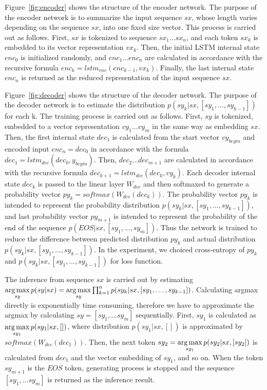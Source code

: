 \documentclass[senior,final,11pt]{iscs-thesis}
\newcommand{\argmax}{\mathop{\rm arg\,max}\limits}
\begin{document}
Figure~\ref{fig:encoder} shows the structure of the encoder network.  The purpose of the encoder network is to summarize the input sequence $sx$, whose length varies depending on the sequence $sx$, into one fixed size vector.
This process is carried out as follows. 
First, $sx$ is tokenized to sequence $sx_{1} \dots sx_{n}$, and each token $sx_{k}$ is embedded to its vector representation $vx_{k}$. 
Then, the initial LSTM internal state $enc_0$ is initialized randomly, 
and $ enc_{1} \dots enc_{n} $ are calculated in accordance with the recursive formula $ enc_{k} = lstm_{enc}(enc_{k-1},vx_{k}) $.
Finally, the last internal state $ enc_{n}$ is returned as the reduced representation of the input sequence $sx$.

Figure~\ref{fig:decoder} shows the structure of the decoder network.  The purpose of the decoder network is to estimate the distribution $ p(sy_k|sx,[sy_1,\dots,sy_{k-1}]) $ for each k. 
The training process is carried out as follows. 
First, $sy$ is tokenized, embedded to a vector representation $vy_{1} \dots vy_{m}$ in the same way as embedding $sx$.
Then, the first internal state $ dec_{1}$ is calculated from the start vector $vy_{begin}$ and encoded input $ enc_{n} = dec_{0} $ in accordance with the formula  $ dec_1 = lstm_{dec}(dec_{0},y_{begin}) $.
Then, $ dec_{2} \dots dec_{m+1} $ are calculated in accordance with the recursive formula $ dec_{k+1} = lstm_{dec}(dec_{k},vy_{k}) $.
Each decoder internal state $ dec_{k} $ is passed to the linear layer $ W_{dec} $ and then softmaxed to generate a probability vector $ py_{k} = softmax(W_{dec}(dec_{k}))$.
The probability vector $ py_{k} $ is intended to represent the probability distribution $ p(sy_k|sx,[sy_1,\dots,sy_{k-1}]) $,
and last probability vector $ py_{m+1} $ is intended to represent the probability of the end of the sequence $ p(EOS|sx,[sy_1,\dots,sy_{m}]) $.
Thus the network is trained to reduce the difference between predicted distribution $ py_{k} $ and actual distribution $ p(sy_k|sx,[sy_1,\dots,sy_{k-1}]) $.
In the experiment, we choiced cross-entropy of $ py_{k} $ and $ p(sy_k|sx,[sy_1,\dots,sy_{k-1}]) $ for loss function.

The inference from sequence $sx$ is carried out by estimating
$ \argmax_{sy} p(sy|sx) = \argmax_{sy} \prod_{k=1}^n p(sy_k|sx,[sy_1,\dots,sy_{k-1}]) $.
Calculating argmax directly is exponentially time consuming, therefore we have to approximate the argmax by calculating $sy = [sy_1, \dots sy_m]$ sequentially.
First, $sy_1$ is calculated as $ \argmax_{sy_1} p(sy_1|sx,[]) $, where distribution $ p(sy_1|sx,[]) $ is approximated by 
$ softmax(W_{dec}(dec_{1}))$. 
Then, the next token $sy_2 = \argmax_{sy_1} p(sy_2|sx,[sy_2]) $ is calculated from $ dec_{1} $ and the vector embedding of $sy_1$, and so on.
When the token $sy_{m+1}$ is the $ EOS $ token, generating process is stopped and the sequence $ [sy_1, \dots sy_m]$ is returned as the inference result.
\end{document}
